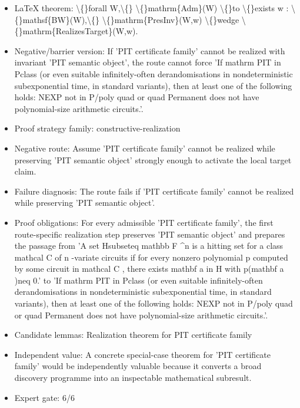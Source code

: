 \documentclass[11pt]{article}
\begin{document}
\begin{itemize}
\item LaTeX theorem: \textbackslash\{\}forall W,\textbackslash\{\} \textbackslash\{\}mathrm\{Adm\}(W) \textbackslash\{\}to \textbackslash\{\}exists w : \textbackslash\{\}mathsf\{BW\}(W),\textbackslash\{\} \textbackslash\{\}mathrm\{PresInv\}(W,w) \textbackslash\{\}wedge \textbackslash\{\}mathrm\{RealizesTarget\}(W,w).
\item Negative/barrier version: If 'PIT certificate family' cannot be realized with invariant 'PIT semantic object', the route cannot force 'If mathrm PIT in Pclass (or even suitable infinitely-often derandomisations in nondeterministic subexponential time, in standard variants), then at least one of the following holds: NEXP not in P/poly quad or quad Permanent does not have polynomial-size arithmetic circuits.'.
\item Proof strategy family: constructive-realization
\item Negative route: Assume 'PIT certificate family' cannot be realized while preserving 'PIT semantic object' strongly enough to activate the local target claim.
\item Failure diagnosis: The route fails if 'PIT certificate family' cannot be realized while preserving 'PIT semantic object'.
\item Proof obligations: For every admissible 'PIT certificate family', the first route-specific realization step preserves 'PIT semantic object' and prepares the passage from 'A set Hsubseteq mathbb F \textasciicircum{}n is a hitting set for a class mathcal C of n -variate circuits if for every nonzero polynomial p computed by some circuit in mathcal C , there exists mathbf a in H with p(mathbf a )neq 0.' to 'If mathrm PIT in Pclass (or even suitable infinitely-often derandomisations in nondeterministic subexponential time, in standard variants), then at least one of the following holds: NEXP not in P/poly quad or quad Permanent does not have polynomial-size arithmetic circuits.'.
\item Candidate lemmas: Realization theorem for PIT certificate family
\item Independent value: A concrete special-case theorem for 'PIT certificate family' would be independently valuable because it converts a broad discovery programme into an inspectable mathematical subresult.
\item Expert gate: 6/6
\end{itemize}
\end{document}
